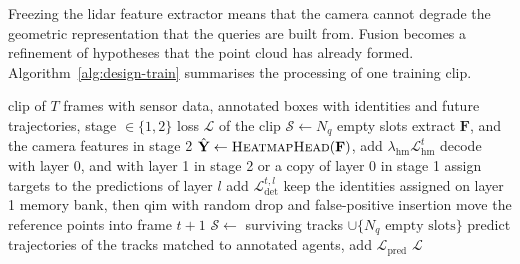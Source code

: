 Freezing the \ac{lidar} feature extractor means that the camera cannot degrade the geometric representation
that the queries are built from. Fusion becomes a refinement of hypotheses that the point cloud has already
formed. Algorithm~\ref{alg:design-train} summarises the processing of one training clip.

\begin{algorithm}[H]
    \caption{Training on one clip}
    \label{alg:design-train}
    \begin{algorithmic}[1]
        \Require clip of $T$ frames with sensor data, annotated boxes with identities and future
        trajectories, stage $\in \{1, 2\}$
        \Ensure loss $\mathcal{L}$ of the clip
        \State $\mathcal{S} \gets N_q$ empty slots
            \State extract $\mathbf{F}$, and the camera features in stage 2
            \State $\hat{\mathbf{Y}} \gets \Call{HeatmapHead}{\mathbf{F}}$, \quad add $\lambda_{\mathrm{hm}} \mathcal{L}^{t}_{\mathrm{hm}}$ 
            \State {}
            \State decode with layer 0, and with layer 1 in stage 2 or a copy of layer 0 in stage 1
                \State assign targets to the predictions of layer $l$ 
                \State add $\mathcal{L}_{\mathrm{det}}^{t,l}$ 
            \EndFor
            \State keep the identities assigned on layer 1
            \State memory bank, then \ac{qim} with random drop and false-positive insertion
                \State move the reference points into frame $t+1$ 
            \EndIf
            \State $\mathcal{S} \gets$ surviving tracks $\cup \{ N_q \text{ empty slots} \}$
        \EndFor
        \State predict trajectories of the tracks matched to annotated agents, add $\mathcal{L}_{\mathrm{pred}}$ 
        \State \Return $\mathcal{L}$
    \end{algorithmic}
\end{algorithm}



